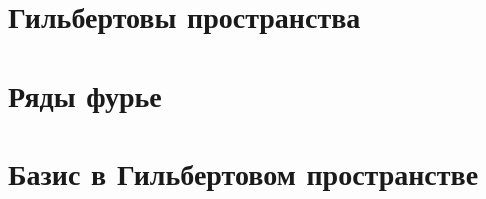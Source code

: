 \section{Гильбертовы пространства}

\section{Ряды фурье}

\section{Базис в Гильбертовом пространстве}
